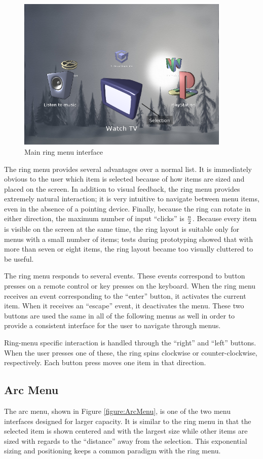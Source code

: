 \documentclass[letterpaper, titlepage, 11pt]{article}
\begin{document}
\begin{figure}[htb]
\centering
\includegraphics[width=4in]{figures/ring_menu}
\caption{Main ring menu interface\label{figure:RingMenu}}
\end{figure}

The ring menu provides several advantages over a normal list.  It is
immediately obvious to the user which item is selected because of how items
are sized and placed on the screen.  In addition to visual feedback, the ring
menu provides extremely natural interaction; it is very intuitive to navigate
between menu items, even in the absence of a pointing device.  Finally,
because the ring can rotate in either direction, the maximum number of input
``clicks'' is $n \over 2$.  Because every item is visible on the screen at the
same time, the ring layout is suitable only for menus with a small number
of items; tests during prototyping showed that with more than seven or eight
items, the ring layout became too visually cluttered to be useful.

The ring menu responds to several events.  These events correspond to button
presses on a remote control or key presses on the keyboard.  When the ring
menu receives an event corresponding to the ``enter'' button, it activates the
current item. When it receives an ``escape'' event, it deactivates the menu.
These two buttons are used the same in all of the following menus as well in
order to provide a consistent interface for the user to navigate through menus.

Ring-menu specific interaction is handled through the ``right'' and ``left''
buttons.  When the user presses one of these, the ring spins clockwise or
counter-clockwise, respectively.  Each button press moves one item in that
direction.

\subsection{Arc Menu}
The arc menu, shown in Figure \ref{figure:ArcMenu}, is one of the two menu
interfaces designed for larger capacity.  It is similar to the ring menu in
that the selected item is shown centered and with the largest size while other
items are sized with regards to the ``distance'' away from the selection.
This exponential sizing and positioning keeps a common paradigm with the ring
menu.
\end{document}
